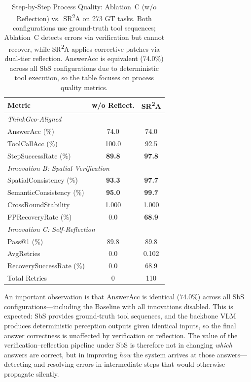 \documentclass[journal]{IEEEtran}
\begin{document}
\begin{table}[t]
\centering
\caption{Step-by-Step Process Quality: Ablation~C (w/o Reflection) vs.\ SR\textsuperscript{2}A on 273 GT tasks. Both configurations use ground-truth tool sequences; Ablation~C detects errors via verification but cannot recover, while SR\textsuperscript{2}A applies corrective patches via dual-tier reflection. AnswerAcc is equivalent (74.0\%) across all SbS configurations due to deterministic tool execution, so the table focuses on process quality metrics.}
\label{tab:sbs_results}
\begin{tabular}{l c c}
\toprule
\textbf{Metric} & \textbf{w/o Reflect.} & \textbf{SR\textsuperscript{2}A} \\
\midrule
\multicolumn{3}{l}{\textit{ThinkGeo-Aligned}} \\
AnswerAcc (\%) & 74.0 & 74.0 \\
ToolCallAcc (\%) & 100.0 & 92.5 \\
StepSuccessRate (\%) & \textbf{89.8} & \textbf{97.8} \\
\midrule
\multicolumn{3}{l}{\textit{Innovation B: Spatial Verification}} \\
SpatialConsistency (\%) & \textbf{93.3} & \textbf{97.7} \\
SemanticConsistency (\%) & \textbf{95.0} & \textbf{99.7} \\
CrossRoundStability & 1.000 & 1.000 \\
FPRecoveryRate (\%) & 0.0 & \textbf{68.9} \\
\midrule
\multicolumn{3}{l}{\textit{Innovation C: Self-Reflection}} \\
Pass@1 (\%) & 89.8 & 89.8 \\
AvgRetries & 0.0 & 0.102 \\
RecoverySuccessRate (\%) & 0.0 & 68.9 \\
Total Retries & 0 & 110 \\
\bottomrule
\end{tabular}
\end{table}

An important observation is that AnswerAcc is identical (74.0\%) across all SbS configurations---including the Baseline with all innovations disabled.
This is expected: SbS provides ground-truth tool sequences, and the backbone VLM produces deterministic perception outputs given identical inputs, so the final answer correctness is unaffected by verification or reflection.
The value of the verification--reflection pipeline under SbS is therefore not in changing \emph{which} answers are correct, but in improving \emph{how} the system arrives at those answers---detecting and resolving errors in intermediate steps that would otherwise propagate silently.
\end{document}
